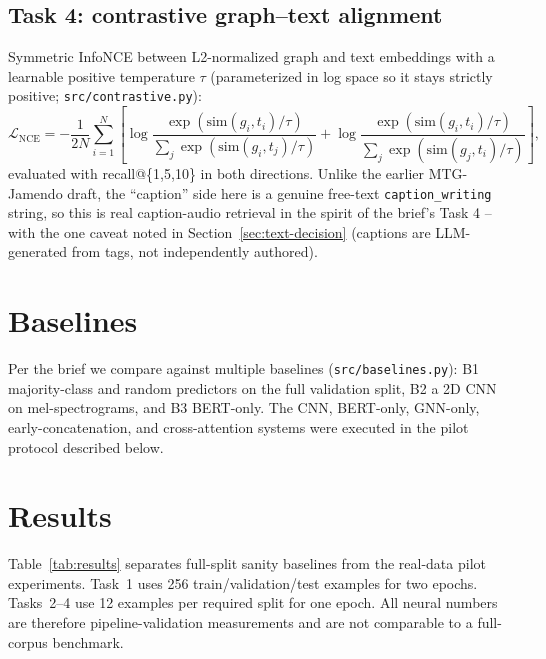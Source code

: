 \documentclass{article}
\begin{document}
\subsection{Task 4: contrastive graph--text alignment}
Symmetric InfoNCE between L2-normalized graph and text embeddings with a
learnable positive temperature $\tau$ (parameterized in log space so it
stays strictly positive; \texttt{src/contrastive.py}):
\begin{equation}
\mathcal{L}_{\text{NCE}} = -\frac{1}{2N}\sum_{i=1}^{N}\left[
  \log \frac{\exp(\mathrm{sim}(g_i,t_i)/\tau)}{\sum_j \exp(\mathrm{sim}(g_i,t_j)/\tau)}
  + \log \frac{\exp(\mathrm{sim}(g_i,t_i)/\tau)}{\sum_j \exp(\mathrm{sim}(g_j,t_i)/\tau)}
\right],
\end{equation}
evaluated with recall@\{1,5,10\} in both directions. Unlike the earlier
MTG-Jamendo draft, the ``caption'' side here is a genuine free-text
\texttt{caption\_writing} string, so this is real caption-audio retrieval
in the spirit of the brief's Task 4 -- with the one caveat noted in
Section~\ref{sec:text-decision} (captions are LLM-generated from tags,
not independently authored).

\section{Baselines}
\label{sec:baselines}

Per the brief we compare against multiple baselines (\texttt{src/baselines.py}):
B1 majority-class and random predictors on the full validation split, B2 a
2D CNN on mel-spectrograms, and B3 BERT-only. The CNN, BERT-only, GNN-only,
early-concatenation, and cross-attention systems were executed in the pilot
protocol described below.

\section{Results}
\label{sec:results}

Table~\ref{tab:results} separates full-split sanity baselines from the
real-data pilot experiments. Task~1 uses 256 train/validation/test examples
for two epochs. Tasks~2--4 use 12 examples per required split for one epoch.
All neural numbers are therefore pipeline-validation measurements and are
not comparable to a full-corpus benchmark.
\end{document}
